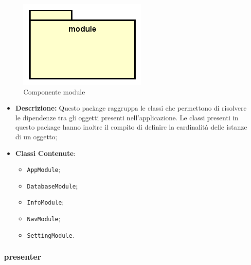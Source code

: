 \documentclass[../DefinizioneDiProdotto.tex]{subfiles}
\begin{document}
\begin{figure}[H]
	\centering
	\includegraphics[width=\maxwidth]{img/package/module.png}
	\caption{Componente module}\label{fig:module} 
\end{figure}
\begin{itemize}
	\item \textbf{Descrizione:} Questo package raggruppa le classi che permettono di risolvere le dipendenze tra gli oggetti presenti nell'applicazione. Le classi presenti in questo package hanno inoltre il compito di definire la cardinalità delle istanze di un oggetto;
	\item \textbf{Classi Contenute}:
	\begin{itemize}
		\item \texttt{AppModule};
		
		\item \texttt{DatabaseModule};
		
		\item \texttt{InfoModule};
		
		\item \texttt{NavModule};
		
		\item \texttt{SettingModule}.
		
	\end{itemize}
\end{itemize}

\subsubsection{presenter}
\end{document}

